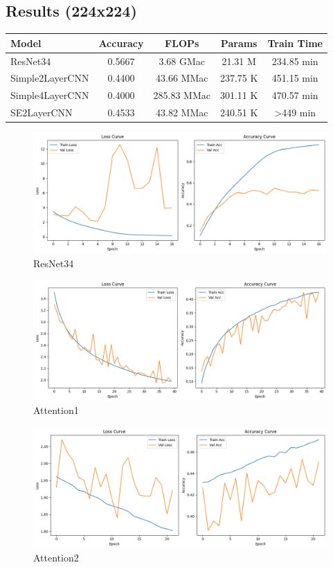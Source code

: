 \documentclass[12pt]{article}
\begin{document}
\subsection*{Results (224x224)}

\begin{center}
\begin{tabular}{lcccc}
\toprule
Model & Accuracy & FLOPs & Params & Train Time \\
\midrule
ResNet34 & 0.5667 & 3.68 GMac & 21.31 M & 234.85 min \\
Simple2LayerCNN & 0.4400 & 43.66 MMac & 237.75 K & 451.15 min \\
Simple4LayerCNN & 0.4000 & 285.83 MMac & 301.11 K & 470.57 min \\
SE2LayerCNN & 0.4533 & 43.82 MMac & 240.51 K & >449 min \\
\bottomrule
\end{tabular}
\end{center}





\begin{figure}[H]
\centering
\includegraphics[width=0.8\linewidth]{results/ResNet34.png}
\caption{ResNet34}
\end{figure}

\begin{figure}[H]
\centering
\includegraphics[width=0.8\linewidth]{results/Attention1.png}
\caption{Attention1}
\end{figure}


\begin{figure}[H]
\centering
\includegraphics[width=0.8\linewidth]{results/Attention2.png}
\caption{Attention2}
\end{figure}
\end{document}
